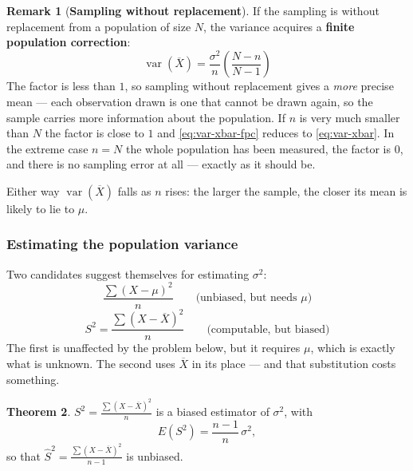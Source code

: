 \documentclass[11pt,a4paper]{article}
\theoremstyle{definition}
\newtheorem{thm}{Theorem}[section]
\newtheorem{remark}[thm]{Remark}
\begin{document}
\begin{remark}[\textbf{Sampling without replacement}]
If the sampling is without replacement from a population of size $N$, the variance acquires a
\textbf{finite population correction}:
\begin{equation}\label{eq:var-xbar-fpc}
\operatorname{var}(\overline{X})=\frac{\sigma^2}{n}\left(\frac{N-n}{N-1}\right)
\end{equation}
The factor is less than $1$, so sampling without replacement gives a \emph{more} precise mean
--- each observation drawn is one that cannot be drawn again, so the sample carries more
information about the population. If $n$ is very much smaller than $N$ the factor is close to
$1$ and \eqref{eq:var-xbar-fpc} reduces to \eqref{eq:var-xbar}. In the extreme case $n=N$ the
whole population has been measured, the factor is $0$, and there is no sampling error at all
--- exactly as it should be.

Either way $\operatorname{var}(\overline{X})$ falls as $n$ rises: the larger the sample, the
closer its mean is likely to lie to $\mu$.
\end{remark}

\subsubsection{Estimating the population variance}

Two candidates suggest themselves for estimating $\sigma^2$:
\[\frac{\sum (X-\mu)^2}{n}\qquad \text{(unbiased, but needs }\mu\text{)}\]
\[S^2=\frac{\sum (X-\overline{X})^2}{n}\qquad \text{(computable, but biased)}\]
The first is unaffected by the problem below, but it requires $\mu$, which is exactly what is
unknown. The second uses $\overline{X}$ in its place --- and that substitution costs
something.

\begin{thm}
$S^2=\frac{\sum(X-\overline{X})^2}{n}$ is a biased estimator of $\sigma^2$, with
\[E(S^2)=\frac{n-1}{n}\,\sigma^2,\]
so that $\hat{S}^2=\frac{\sum(X-\overline{X})^2}{n-1}$ is unbiased.
\end{thm}
\end{document}
